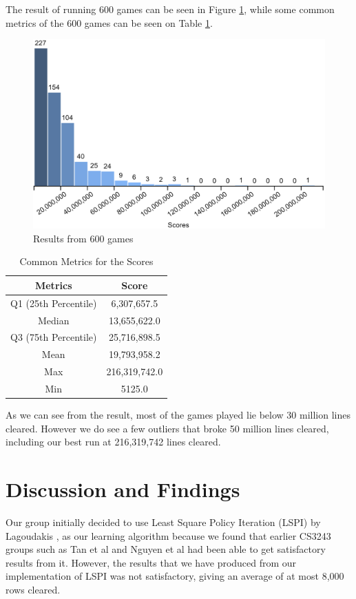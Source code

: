 \documentclass[a4paper,12pt,twocolumn]{article}
\begin{document}
The result of running 600 games can be seen in Figure \ref{score_histogram},
while some common metrics of the 600 games can be seen on Table \ref{metric_scores}.\\

\begin{figure}[h]
    \centering
    \includegraphics[scale=0.15]{games_600_histogram.png}
    \caption{Results from 600 games}
    \label{score_histogram}
\end{figure}

\begin{table}[h]
    \centering
	\begin{tabular}{|c|c|}
		\hline
		\textbf{Metrics}   & \textbf{Score}     \\
		\hline
		Q1 (25th Percentile)  & 6,307,657.5 \\
		\hline
		Median         & 13,655,622.0  \\
		\hline
		Q3 (75th Percentile)      & 25,716,898.5 \\
		\hline
		Mean & 19,793,958.2 \\
		\hline
		Max     & 216,319,742.0  \\
		\hline
		Min          & 5125.0 \\
		\hline
	\end{tabular}
	\caption{Common Metrics for the Scores}
	\label{metric_scores}
\end{table}

As we can see from the result, most of the games played lie below 30 million lines
cleared. However we do see a few outliers that broke 50 million lines cleared, including
our best run at 216,319,742 lines cleared.

\section{Discussion and Findings}
\label{discussion_n_findings}
Our group initially decided to use Least Square Policy Iteration (LSPI) by Lagoudakis \cite{lagoudakis},
as our learning algorithm because we found that earlier CS3243 groups such as
Tan et al \cite{shawntan} and Nguyen et al \cite{nhannguyen} had been able to get
satisfactory results from it. However, the results that we have produced from our
implementation of LSPI was not satisfactory, giving an average of at most 8,000 rows
cleared.\\
\end{document}
